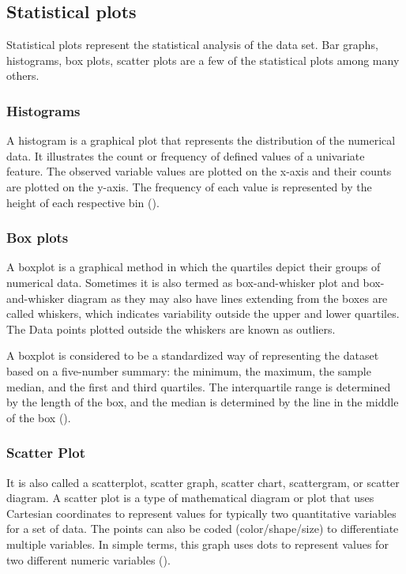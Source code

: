 \documentclass[12 pt]{scrartcl}
\begin{document}
	\subsection{Statistical plots}
	
	Statistical plots represent the statistical analysis of the data set. Bar graphs, histograms, box plots, scatter plots are a few of the statistical plots among many others.
	
	\subsubsection{Histograms} 
	A histogram is a graphical plot that represents the distribution of the numerical data. It illustrates the count or frequency of defined values of a univariate feature. The observed variable values are plotted on the x-axis and their counts are plotted on the y-axis. The frequency of each value is represented by the height of each respective bin (\cite{text}).
	
	\subsubsection{Box plots}
	A boxplot is a graphical method in which the quartiles depict their groups of numerical data. Sometimes it is also termed as box-and-whisker plot and box-and-whisker diagram as they may also have lines extending from the boxes are called whiskers, which indicates variability outside the upper and lower quartiles. The Data points plotted outside the whiskers are known as outliers.
	
	A boxplot is considered to be a standardized way of representing the dataset based on a five-number summary: the minimum, the maximum, the sample median, and the first and third quartiles. The interquartile range is determined by the length of the box, and the median is determined by the line in the middle of the box (\cite{Christ}).
	
	
	\subsubsection{Scatter Plot}
	It is also called a scatterplot, scatter graph, scatter chart, scattergram, or scatter diagram. A scatter plot is a type of mathematical diagram or plot that uses Cartesian coordinates to represent values for typically two quantitative variables for a set of data. The points can also be coded  (color/shape/size) to differentiate multiple variables. In simple terms, this graph uses dots to represent values for two different numeric variables (\cite{Howard}).
	
\end{document}
